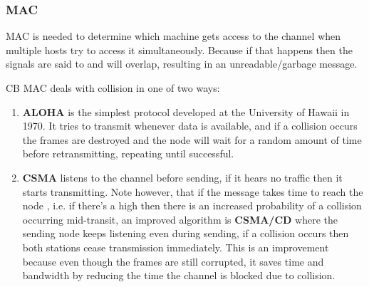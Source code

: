 

	\subsubsection{MAC}

		\par{MAC is needed to determine which machine gets access to the channel when multiple hosts try to access it simultaneously. Because if that happens then the signals are said to  and will overlap, resulting in an unreadable/garbage message.}


		\par{CB MAC deals with collision in one of two ways:}

			\begin{enumerate}
				\item \textbf{ALOHA} is the simplest protocol developed at the University of Hawaii in 1970. It tries to transmit whenever data is available, and if a collision occurs the frames are destroyed and the node will wait for a random amount of time before retransmitting, repeating until successful.

				\item \textbf{CSMA} listens to the channel before sending, if it hears no traffic then it starts transmitting. Note however, that if the message takes time to reach the node , i.e. if there's a high  then there is an increased probability of a collision occurring mid-transit, an improved algorithm is \textbf{CSMA/CD} where the sending node keeps listening even during sending, if a collision occurs then both stations cease transmission immediately. This is an improvement because even though the frames are still corrupted, it saves time and bandwidth by reducing the time the channel is blocked due to collision.
			\end{enumerate}

	




